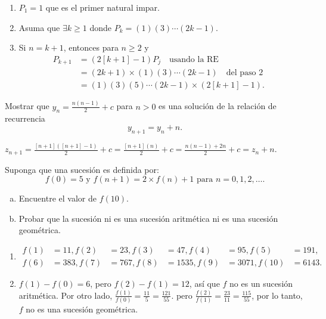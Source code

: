 \begin{solution}
\begin{enumerate}[(a)]
		\begin{enumerate}[label={Paso~\arabic*}]
			\item $P_{1}=1$ que es el primer natural impar.
			\item Asuma que $\exists k\geq1$ donde $P_{k}=(1)(3)\cdots\left(2k-1\right)$.
			\item Si $n=k+1$, entonces para $n\geq2$ y
			\begin{align*}
			P_{k+1}&=\left(2\left[k+1\right]-1\right)P_{j}\quad\text{usando la RE}&\\
			&=\left(2k+1\right)\times(1)(3)\cdots\left(2k-1\right)\quad\text{del paso 2}&\\
			&=(1)(3)(5)\cdots\left(2k-1\right)\times\left(2\left[k+1\right]-1\right).
			\end{align*}
		\end{enumerate}
	\end{enumerate}
\end{solution}


\begin{exercise}
	Mostrar que $y_{n}=\frac{n(n-1)}{2}+c$ para $n>0$ es una solución de la relación de recurrencia \[ y_{n+1}=y_{n}+n. \]
\end{exercise}

\begin{solution}
	$z_{n+1}=\frac{\left[n+1\right]\left(\left[n+1\right]-1\right)}{2}+c=\frac{\left[n+1\right]\left(n\right)}{2}+c=\frac{n\left(n-1\right)+2n}{2}+c=z_{n}+n$.
\end{solution}

\begin{exercise}
Suponga que una sucesión es definida por: \[ f(0)=5\text{ y }f(n+1)=2\times f(n)+1\text{ para } n=0,1,2,\ldots. \]
\begin{enumerate}[(a)]
	\item Encuentre el valor de $f(10)$.
	\item Probar que la sucesión ni es una sucesión aritmética ni es una sucesión geométrica.
\end{enumerate}
\end{exercise}

\begin{solution}
	\begin{enumerate}
		\item
		\begin{align*}
		f(1)&=11, f(2)&=23, f(3)&=47, f(4)&=95, f(5)&=191,\\
		f(6)&=383, f(7)&=767, f(8)&=1535, f(9)&=3071, f(10)&=6143.
		\end{align*}
		\item $f(1)-f(0)=6$, pero $f(2)-f(1)=12$, así que $f$ no es un sucesión aritmética. Por otro lado, $\frac{f(1)}{f(0)}=\frac{11}{5}=\frac{121}{55}$. pero $\frac{f(2)}{f(1)}=\frac{23}{11}=\frac{115}{55}$, por lo tanto, $f$ no es una sucesión geométrica.
	\end{enumerate}
\end{solution}

